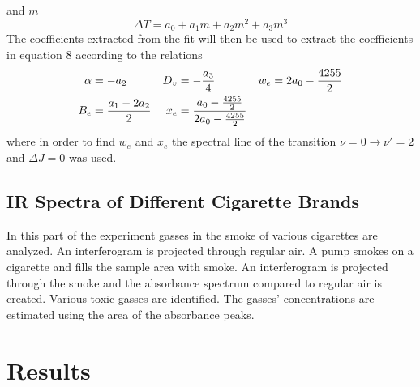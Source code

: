 \documentclass[reprint,amsmath,amssymb,aps, prl]{revtex4-2}
\begin{document}
and $m$
\begin{equation} \label{eq:CO_EnrgStatesFit}
    \Delta T = a_{0}+a_{1}m+a_{2}m^2+a_{3}m^3
\end{equation}
The coefficients extracted from the fit will then be used to extract the coefficients in equation 8 
according to the relations 
\begin{equation}
\begin{aligned}
\alpha &=-a_{2} & D_{v}&=-\frac{a_{3}}{4} & w_{e}&=2a_{0}-\frac{4255}{2} \\
B_{e}&=\frac{a_{1}-2a_{2}}{2} &  x_{e}&=\frac{a_{0}-\frac{4255}{2}}{2a_{0}-\frac{4255}{2}}
\end{aligned}
\label{eq:COFITcoefficients}
\centering
\end{equation}
where in order to find $w_{e}$ and $x_{e}$ the spectral line of the transition $\nu =0 \rightarrow \nu'=2$ and $\Delta J =0$ was used. 

\subsection{IR Spectra of Different Cigarette Brands}
In this part of the experiment gasses in the smoke of various cigarettes are analyzed. An interferogram is projected through regular air. A pump smokes on a cigarette and fills the sample area with smoke. An interferogram is projected through the smoke and the absorbance spectrum compared to regular air is created. Various toxic gasses are identified. The gasses' concentrations are estimated using the area of the absorbance peaks.

\section{Results}
\end{document}
